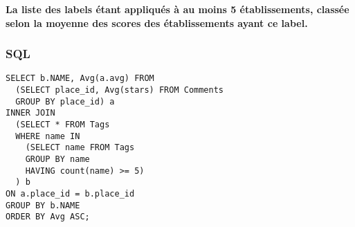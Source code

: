 \documentclass[a4paper,10pt]{article}
\begin{document}
\textbf{La liste des labels étant appliqués à au moins 5 établissements, classée selon la moyenne des scores des établissements ayant ce label.}

\subsubsection{SQL}

\begin{verbatim}
SELECT b.NAME, Avg(a.avg) FROM 
  (SELECT place_id, Avg(stars) FROM Comments
  GROUP BY place_id) a
INNER JOIN
  (SELECT * FROM Tags
  WHERE name IN 
    (SELECT name FROM Tags
    GROUP BY name
    HAVING count(name) >= 5)
  ) b
ON a.place_id = b.place_id
GROUP BY b.NAME
ORDER BY Avg ASC; 
\end{verbatim}
\end{document}
